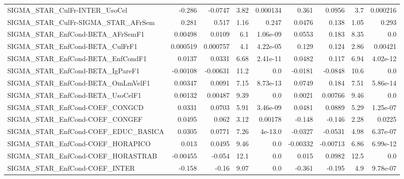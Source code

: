\begin{tabular}{lrrrrrrrr}
SIGMA\_STAR\_CulFr-INTER\_UsoCel         &      -0.286 &      -0.0747 &    3.82 & 0.000134 &      0.361 &      0.0956 &          3.7 &      0.000216 \\
SIGMA\_STAR\_CulFr-SIGMA\_STAR\_AFrSem    &       0.281 &        0.517 &    1.16 &    0.247 &     0.0476 &       0.138 &         1.05 &         0.293 \\
SIGMA\_STAR\_EnfCond-BETA\_AFrSemF1      &     0.00498 &       0.0109 &     6.1 & 1.06e-09 &     0.0553 &       0.183 &         8.35 &           0.0 \\
SIGMA\_STAR\_EnfCond-BETA\_CulFrF1       &    0.000519 &     0.000757 &     4.1 & 4.22e-05 &      0.129 &       0.124 &         2.86 &       0.00421 \\
SIGMA\_STAR\_EnfCond-BETA\_EnfCondF1     &      0.0137 &       0.0331 &    6.68 & 2.41e-11 &     0.0482 &       0.117 &         6.94 &      4.02e-12 \\
SIGMA\_STAR\_EnfCond-BETA\_IgPareF1      &    -0.00108 &     -0.00631 &    11.2 &      0.0 &    -0.0181 &     -0.0848 &         10.6 &           0.0 \\
SIGMA\_STAR\_EnfCond-BETA\_OmLmVelF1     &     0.00347 &       0.0091 &    7.15 & 8.73e-13 &     0.0749 &       0.184 &         7.51 &      5.86e-14 \\
SIGMA\_STAR\_EnfCond-BETA\_UsoCelF1      &     0.00132 &      0.00487 &    9.39 &      0.0 &     0.0021 &     0.00766 &         9.46 &           0.0 \\
SIGMA\_STAR\_EnfCond-COEF\_CONGCD        &      0.0331 &       0.0703 &    5.91 & 3.46e-09 &     0.0481 &      0.0889 &         5.29 &      1.25e-07 \\
SIGMA\_STAR\_EnfCond-COEF\_CONGEF        &      0.0495 &        0.062 &    3.12 &  0.00178 &     -0.148 &      -0.146 &         2.28 &        0.0225 \\
SIGMA\_STAR\_EnfCond-COEF\_EDUC\_BASICA   &      0.0305 &       0.0771 &    7.26 &  4e-13.0 &    -0.0327 &     -0.0531 &         4.98 &      6.37e-07 \\
SIGMA\_STAR\_EnfCond-COEF\_HORAPICO      &       0.013 &       0.0495 &    9.46 &      0.0 &   -0.00332 &    -0.00713 &         6.86 &      6.99e-12 \\
SIGMA\_STAR\_EnfCond-COEF\_HORASTRAB     &    -0.00455 &       -0.054 &    12.1 &      0.0 &      0.015 &      0.0982 &         12.5 &           0.0 \\
SIGMA\_STAR\_EnfCond-COEF\_INTER         &      -0.158 &        -0.16 &    9.07 &      0.0 &     -0.361 &      -0.195 &          4.9 &      9.78e-07 \\

\end{tabular}
